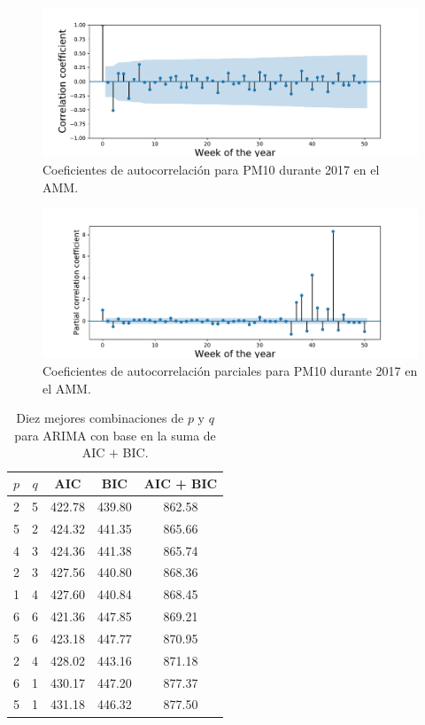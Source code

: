 \documentclass{elsarticle}
\begin{document}
\begin{figure}
\centering
	\includegraphics[width=1\textwidth]{acf_PM10_2017_df2.pdf}
	\caption{Coeficientes de autocorrelación para PM10 durante 2017 en el AMM.}
	\label{acf_PM10_2017_df2}
\end{figure}

\begin{figure}
\centering
	\includegraphics[width=1\textwidth]{pacf_PM10_2017_df2.pdf}
	\caption{Coeficientes de autocorrelación parciales para PM10 durante 2017 en el AMM.}
	\label{pacf_PM10_2017_df2}
\end{figure}

\begin{table}
	\centering
	\caption{Diez mejores combinaciones de $p$ y $q$ para ARIMA con base en la suma de AIC $+$ BIC.}
	\label{aicbic}
        \begin{tabular}{|c|c|c|c|c|}
        \hline
        $p$ &  $q$ &         AIC &         BIC &     AIC + BIC \\
        \hline
        2 &  5 &  422.78 &  439.80 &   862.58 \\
        5 &  2 &  424.32 &  441.35 &   865.66 \\
        4 &  3 &  424.36 &  441.38 &   865.74 \\
        2 &  3 &  427.56 &  440.80 &   868.36 \\
        1 &  4 &  427.60 &  440.84 &   868.45 \\
        6 &  6 &  421.36 &  447.85 &   869.21 \\
        5 &  6 &  423.18 &  447.77 &   870.95 \\
        2 &  4 &  428.02 &  443.16 &   871.18 \\
        6 &  1 &  430.17 &  447.20 &   877.37 \\
        5 &  1 &  431.18 &  446.32 &   877.50 \\
        \hline
        \end{tabular}
\end{table}
\end{document}

